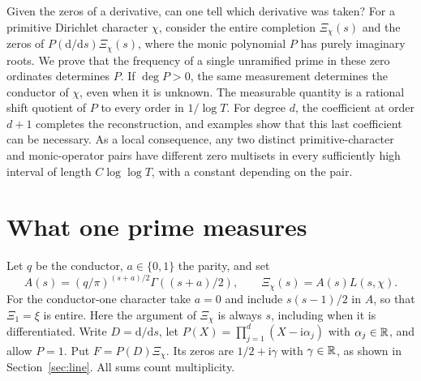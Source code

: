 \documentclass[11pt,letterpaper]{article}
\newcommand{\dd}{\mathrm d}\newcommand{\ii}{\mathrm i}
\begin{document}
\thispagestyle{plain}
\medskip

\medskip
\noindent Given the zeros of a derivative, can one tell which derivative was taken?
For a primitive Dirichlet character $\chi$, consider the entire completion
$\Xi_\chi(s)$ and the zeros of $P(\dd/\dd s)\Xi_\chi(s)$, where the monic
polynomial $P$ has purely imaginary roots. We prove that the frequency of a single unramified prime
in these zero ordinates determines $P$. If $\deg P>0$, the same
measurement determines the conductor of $\chi$, even when it is unknown.
The measurable quantity is a rational shift quotient of $P$ to every
order in $1/\log T$. For degree $d$, the coefficient at order $d+1$
completes the reconstruction, and examples show that this last coefficient
can be necessary. As a local consequence, any two distinct primitive-character
and monic-operator pairs have different zero multisets in every sufficiently
high interval of length $C\log\log T$, with a constant depending on the pair.

\section{What one prime measures}
Let $q$ be the conductor, $a\in\{0,1\}$ the parity, and set
\[
 A(s)=(q/\pi)^{(s+a)/2}\Gamma((s+a)/2),\qquad \Xi_\chi(s)=A(s)L(s,\chi).
\]
For the conductor-one character take $a=0$ and include $s(s-1)/2$ in $A$,
so that $\Xi_1=\xi$ is entire. Here the argument of $\Xi_\chi$ is always
$s$, including when it is differentiated. Write $D=\dd/\dd s$, let
$P(X)=\prod_{j=1}^d(X-\ii\alpha_j)$ with $\alpha_j\in\mathbb R$, and allow $P=1$.
Put $F=P(D)\Xi_\chi$. Its zeros are $1/2+\ii\gamma$ with $\gamma\in\mathbb R$,
as shown in Section~\ref{sec:line}. All sums count multiplicity.
\end{document}

